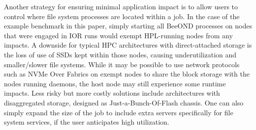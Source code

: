 Another strategy for ensuring minimal application impact is to allow users to control where file system processes are located within a job. In the case of the example benchmark in this paper, simply starting all BeeOND processes on nodes that were engaged in IOR runs would exempt HPL-running nodes from any impacts. A downside for typical HPC architectures with direct-attached storage is the loss of use of SSDs kept within those nodes, causing underutilization and smaller/slower file systems. While it may be possible to use network protocols such as NVMe Over Fabrics on exempt nodes to share the block storage with the nodes running daemons, the host node may still experience some runtime impacts. Less risky but more costly solutions include architectures with disaggregated storage, designed as Just-a-Bunch-Of-Flash chassis. One can also simply expand the size of the job to include extra servers specifically for file system services, if the user anticipates high utilization.
